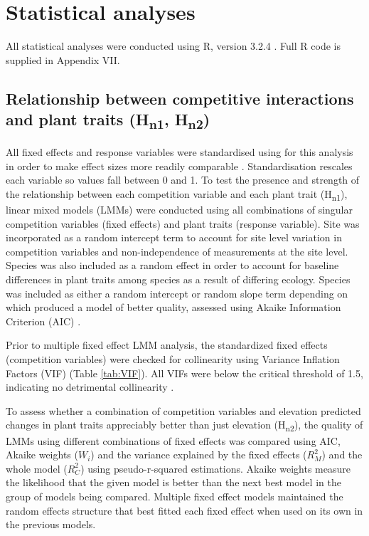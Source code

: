 \documentclass[a4paper,10pt,]{report}
\begin{document}
\section{Statistical analyses}
All statistical analyses were conducted using R, version 3.2.4 \citep{R2016}. Full R code is supplied in Appendix VII.

\subsection*{Relationship between competitive interactions and plant traits (H\textsubscript{n1}, H\textsubscript{n2})}

All fixed effects and response variables were standardised using for this analysis in order to make effect sizes more readily comparable \citep{Grueber2011, Gelman2014}. Standardisation rescales each variable so values fall between 0 and 1. To test the presence and strength of the relationship between each competition variable and each plant trait (H\textsubscript{n1}), linear mixed models (LMMs) were conducted using all combinations of singular competition variables (fixed effects) and plant traits (response variable). Site was incorporated as a random intercept term to account for site level variation in competition variables and non-independence of measurements at the site level. Species was also included as a random effect in order to account for baseline differences in plant traits among species as a result of differing ecology. Species was included as either a random intercept or random slope term depending on which produced a model of better quality, assessed using Akaike Information Criterion (AIC) \citep{Akaike1998}. 

Prior to multiple fixed effect LMM analysis, the standardized fixed effects (competition variables) were checked for collinearity using Variance Inflation Factors (VIF) (Table \ref{tab:VIF}). All VIFs were below the critical threshold of 1.5, indicating no detrimental collinearity \citep{Zuur2009}.

To assess whether a combination of competition variables and elevation predicted changes in plant traits appreciably better than just elevation (H\textsubscript{n2}), the quality of LMMs using different combinations of fixed effects was compared using AIC, Akaike weights ($W_i$) and the variance explained by the fixed effects ($R_M^2$) and the whole model ($R_C^2$) using pseudo-r-squared estimations. Akaike weights measure the likelihood that the given model is better than the next best model in the group of models being compared. Multiple fixed effect models maintained the random effects structure that best fitted each fixed effect when used on its own in the previous models. 
\end{document}
